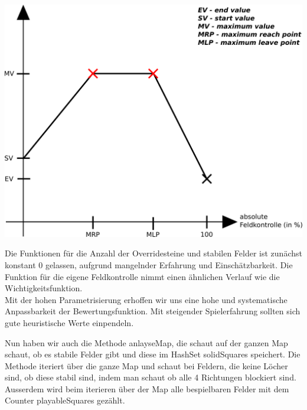 \begin{center}
\includegraphics[scale=0.15]{ExpectedValueFunction.pdf}
\end{center}
Die Funktionen für die Anzahl der Overridesteine und stabilen Felder ist zunächst konstant 0 gelassen, aufgrund mangelnder Erfahrung und Einschätzbarkeit. Die Funktion für die eigene Feldkontrolle nimmt einen ähnlichen Verlauf wie die Wichtigkeitsfunktion.\\
Mit der hohen Parametrisierung erhoffen wir uns eine hohe und systematische Anpassbarkeit der Bewertungsfunktion. Mit steigender Spielerfahrung sollten sich gute heuristische Werte einpendeln.
\newline

\noindent
Nun haben wir auch die Methode anlayseMap, die schaut auf der ganzen Map schaut, ob es stabile Felder gibt und diese im HashSet solidSquares speichert. Die Methode iteriert über die ganze Map und schaut bei Feldern, die keine Löcher sind, ob diese stabil sind, indem man schaut ob alle 4 Richtungen blockiert sind. Ausserdem wird beim iterieren über der Map alle bespielbaren Felder mit dem Counter playableSquares gezählt.

